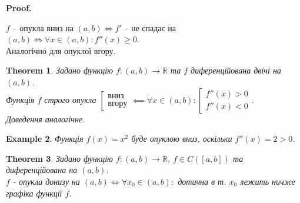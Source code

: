 \documentclass[a4paper, 14pt]{article}
\makeatletter
\def\qed{$\blacksquare$}
\theoremstyle{theoremdd}
\newtheorem{theorem}{Theorem}[subsection]
\theoremstyle{theoremdd}
\theoremstyle{theoremdd}
\theoremstyle{theoremdd}
\newtheorem{example}[theorem]{Example}
\theoremstyle{theoremdd}
\theoremstyle{theoremdd}
\theoremstyle{theoremdd}
\theoremstyle{theoremdd}
\renewenvironment{proof}[1][Proof.\\]{\par
\pushQED{\hfill \qed}%
\normalfont \topsep6\p@\@plus6\p@\relax
\trivlist
\item\relax
{\bfseries
#1\@addpunct{.}}\hspace\labelsep\ignorespaces
}{%
\popQED\endtrivlist\@endpefalse
}
\makeatother
\begin{document}
\begin{proof}
$f$ -- опукла вниз на $(a,b) \iff f'$ -- не спадає на $(a,b) \iff \forall x \in (a,b): f''(x) \geq 0$.\\
Аналогічно для опуклої вгору.
\end{proof}

\begin{theorem}
Задано функцію $f \colon (a,b) \to \mathbb{R}$ та $f$ диференційована двічі на $(a,b)$.\\
Функція $f$ строго опукла $\left[ \begin{gathered} \textrm{вниз} \\ \textrm{вгору} \end{gathered} \right. \impliedby \forall x \in (a,b): \left[ \begin{gathered} f''(x) > 0 \\ f''(x) < 0 \end{gathered} \right.$.\\
\textit{Доведення аналогічне}.
\end{theorem}

\begin{example}
Функція $f(x) = x^2$ буде опуклою вниз, оскільки $f''(x) = 2 > 0$.
\end{example}

\iffalse
\begin{theorem}
Задано функцію $f \colon (a,b) \to \mathbb{R}$, $f \in C([a,b])$ та диференційована на $(a,b)$.\\
$f$ - опукла донизу на $(a,b) \iff \forall x_0 \in (a,b):$ дотична в т. $x_0$ лежить ничже графіка функції $f$.
\end{theorem}
\end{document}
